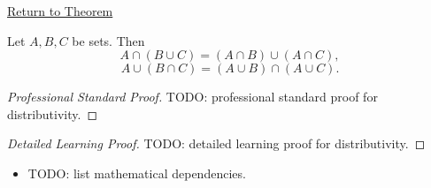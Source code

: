 \newpage
{}
\label{prf:distributivity}

\begin{remark*}[Return]
\hyperref[thm:distributivity]{Return to Theorem}
\end{remark*}

\begin{theorem*}
Let $A,B,C$ be sets. Then
\[
A \cap (B \cup C) = (A \cap B) \cup (A \cap C),
\]
\[
A \cup (B \cap C) = (A \cup B) \cap (A \cup C).
\]
\end{theorem*}

\begin{proof}[Professional Standard Proof]
\LRAProofBodyStart
TODO: professional standard proof for distributivity.
\end{proof}

\begin{proof}[Detailed Learning Proof]
\LRAProofBodyStart
TODO: detailed learning proof for distributivity.
\end{proof}

\begin{remark*}
\end{remark*}

\begin{dependencies}
\begin{itemize}
  \item TODO: list mathematical dependencies.
\end{itemize}
\end{dependencies}

\clearpage
